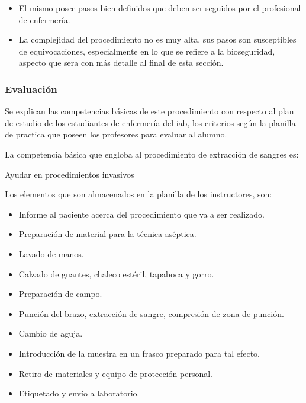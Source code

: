 \begin{itemize}
\item El mismo posee pasos bien definidos que deben ser seguidos por el
    profesional de enfermería.
\item La complejidad del procedimiento no es muy alta, sus pasos son
    susceptibles de equivocaciones, especialmente en lo que se refiere a la
    bioseguridad, aspecto que sera con más detalle al final de esta sección. 
\end{itemize}



\subsubsection{Evaluación}

Se explican las competencias básicas de este procedimiento con
respecto al plan de estudio de los estudiantes de enfermería del \Gls{iab}, los
criterios según la planilla de practica que poseen los profesores para evaluar
al alumno.

La competencia básica que engloba al procedimiento de extracción de sangres es:

\begin{displayquote}
Ayudar en procedimientos invasivos
\end{displayquote}

Los elementos que son almacenados en la planilla de los instructores, son:

\begin{itemize}
\item Informe al paciente acerca del procedimiento que va a ser
    realizado.
\item Preparación de material para la técnica aséptica.
\item Lavado de manos.
\item Calzado de guantes, chaleco estéril, tapaboca y gorro.
\item Preparación de campo.
\item Punción del brazo, extracción de sangre, compresión de zona de punción.
\item Cambio de aguja.
\item Introducción de la muestra en un frasco preparado para tal efecto.
\item Retiro de materiales y equipo de protección personal.
\item Etiquetado y envío a laboratorio.
\end{itemize}

